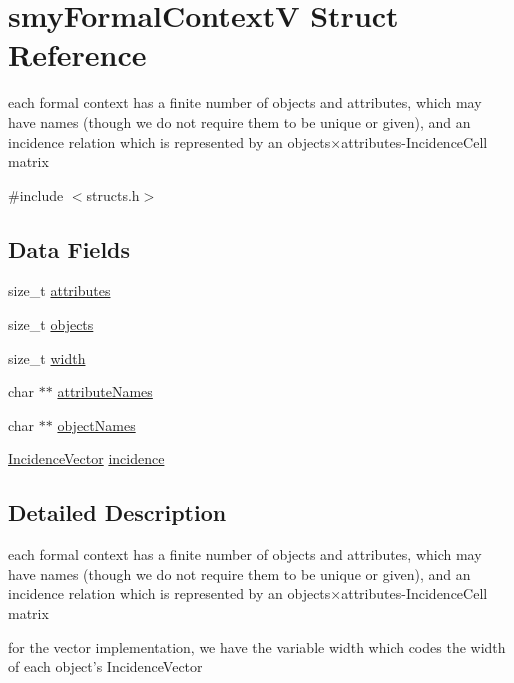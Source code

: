 \hypertarget{structsmyFormalContextV}{\section{smy\-Formal\-Context\-V \-Struct \-Reference}
\label{structsmyFormalContextV}
}


each formal context has a finite number of objects and attributes, which may have names (though we do not require them to be unique or given), and an incidence relation which is represented by an objects×attributes-\/\-Incidence\-Cell matrix  




{\ttfamily \#include $<$structs.\-h$>$}

\subsection*{\-Data \-Fields}
\begin{DoxyCompactItemize}
\item 
size\-\_\-t \hyperlink{structsmyFormalContextV_a94d6bf1233ed7e796e71595d53e85265}{attributes}
\item 
size\-\_\-t \hyperlink{structsmyFormalContextV_a6870c7afe6748004c41c81bd5e1c65d2}{objects}
\item 
size\-\_\-t \hyperlink{structsmyFormalContextV_ab4456c63ae1536d8a9afa9a42c30cd10}{width}
\item 
char $\ast$$\ast$ \hyperlink{structsmyFormalContextV_a10705bdd28894f84042e9c1be7f697c6}{attribute\-Names}
\item 
char $\ast$$\ast$ \hyperlink{structsmyFormalContextV_aac85d520aa4849d3dfbe4b1c85c17555}{object\-Names}
\item 
\hyperlink{vector_8h_aae617489ac88fff15979050721fe581f}{\-Incidence\-Vector} \hyperlink{structsmyFormalContextV_a1cc9b0c27ade0450dfe33b04c1f767b8}{incidence}
\end{DoxyCompactItemize}


\subsection{\-Detailed \-Description}
each formal context has a finite number of objects and attributes, which may have names (though we do not require them to be unique or given), and an incidence relation which is represented by an objects×attributes-\/\-Incidence\-Cell matrix 

for the vector implementation, we have the variable width which codes the width of each object's \-Incidence\-Vector 

